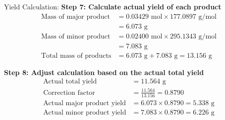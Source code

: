 \documentclass[aspectratio=169, 9pt]{beamer}
\begin{document}
\begin{frame}{Yield Calculation:}
\textbf{Step 7: Calculate actual yield of each product}
\begin{align}
\text{Mass of major product} &= 0.03429 \text{ mol} \times 177.0897 \text{ g/mol} \\
&= 6.073 \text{ g} \\
\text{Mass of minor product} &= 0.02400 \text{ mol} \times 295.1343 \text{ g/mol} \\
&= 7.083 \text{ g} \\
\text{Total mass of products} &= 6.073 \text{ g} + 7.083 \text{ g} = 13.156 \text{ g}
\end{align}

\textbf{Step 8: Adjust calculation based on the actual total yield}
\begin{align}
\text{Actual total yield} &= 11.564 \text{ g} \\
\text{Correction factor} &= \frac{11.564}{13.156} = 0.8790 \\
\text{Actual major product yield} &= 6.073 \times 0.8790 = 5.338 \text{ g} \\
\text{Actual minor product yield} &= 7.083 \times 0.8790 = 6.226 \text{ g}
\end{align}
\end{frame}
\end{document}
